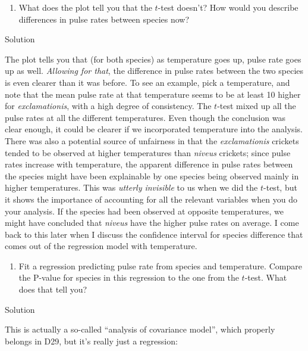 \documentclass[]{tufte-book}
\providecommand{\tightlist}{%
  \setlength{\itemsep}{0pt}\setlength{\parskip}{0pt}}
\theoremstyle{definition}
\theoremstyle{definition}
\theoremstyle{definition}
\theoremstyle{remark}
\begin{document}
\begin{enumerate}
\def\labelenumi{(\alph{enumi})}
\setcounter{enumi}{7}
\tightlist
\item
  What does the plot tell you that the \(t\)-test doesn't? How would you
  describe differences in pulse rates between species now?
\end{enumerate}

Solution

The plot tells you that (for both species) as temperature goes up, pulse
rate goes up as well. \emph{Allowing for that}, the difference in pulse
rates between the two species is even clearer than it was before. To see
an example, pick a temperature, and note that the mean pulse rate at
that temperature seems to be at least 10 higher for
\emph{exclamationis}, with a high degree of consistency. The \(t\)-test
mixed up all the pulse rates at all the different temperatures. Even
though the conclusion was clear enough, it could be clearer if we
incorporated temperature into the analysis. There was also a potential
source of unfairness in that the \emph{exclamationis} crickets tended to
be observed at higher temperatures than \emph{niveus} crickets; since
pulse rates increase with temperature, the apparent difference in pulse
rates between the species might have been explainable by one species
being observed mainly in higher temperatures. This was \emph{utterly
invisible} to us when we did the \(t\)-test, but it shows the importance
of accounting for all the relevant variables when you do your analysis.
If the species had been observed at opposite temperatures, we might have
concluded  that \emph{niveus} have the higher
pulse rates on average. I come back to this later when I discuss the
confidence interval for species difference that comes out of the
regression model with temperature.

\begin{enumerate}
\def\labelenumi{(\roman{enumi})}
\tightlist
\item
  Fit a regression predicting pulse rate from species and temperature.
  Compare the P-value for species in this regression to the one from the
  \(t\)-test. What does that tell you?
\end{enumerate}

Solution

This is actually a so-called ``analysis of covariance model'', which
properly belongs in D29, but it's really just a regression:
\end{document}
